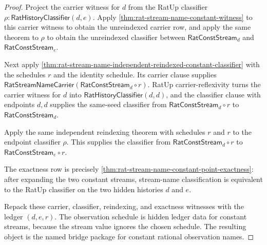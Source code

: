 \begin{proof}
Project the carrier witness for $d$ from the RatUp classifier
$\rho:\mathsf{RatHistoryClassifier}(d,e)$. Apply
\autoref{thm:rat-stream-name-constant-witness} to this carrier witness to obtain
the unreindexed carrier row, and apply the same theorem to $\rho$ to obtain the
unreindexed classifier between $\mathsf{RatConstStream}_d$ and
$\mathsf{RatConstStream}_e$.

Next apply
\autoref{thm:rat-stream-name-independent-reindexed-constant-classifier} with
the schedules $r$ and the identity schedule. Its carrier clause supplies
$\mathsf{RatStreamNameCarrier}(\mathsf{RatConstStream}_d\circ r)$. RatUp
carrier-reflexivity turns the carrier witness for $d$ into
$\mathsf{RatHistoryClassifier}(d,d)$, and the classifier clause with endpoints
$d,d$ supplies the same-seed classifier from
$\mathsf{RatConstStream}_d\circ r$ to $\mathsf{RatConstStream}_d$.

Apply the same independent reindexing theorem with schedules $r$ and $r$ to the
endpoint classifier $\rho$. This supplies the classifier from
$\mathsf{RatConstStream}_d\circ r$ to
$\mathsf{RatConstStream}_e\circ r$.

The exactness row is precisely
\autoref{thm:rat-stream-name-constant-point-exactness}: after expanding the two
constant streams, stream-name classification is equivalent to the RatUp
classifier on the two hidden histories $d$ and $e$.

Repack these carrier, classifier, reindexing, and exactness witnesses with the
ledger $(d,e,r)$. The observation schedule is hidden ledger data for constant
streams, because the stream value ignores the chosen schedule. The resulting
object is the named bridge package for constant rational observation names.
\end{proof}

